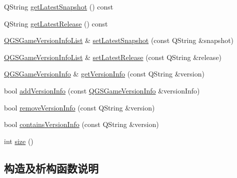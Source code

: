 \begin{DoxyCompactItemize}
\item 
Q\+String \mbox{\hyperlink{class_q_g_s_game_version_info_list_abc6e965492ca1e2851810ed19025bc1a}{get\+Latest\+Snapshot}} () const
\item 
Q\+String \mbox{\hyperlink{class_q_g_s_game_version_info_list_abef58dd9ea504eb695114ad4aa42890a}{get\+Latest\+Release}} () const
\item 
\mbox{\hyperlink{class_q_g_s_game_version_info_list}{Q\+G\+S\+Game\+Version\+Info\+List}} \& \mbox{\hyperlink{class_q_g_s_game_version_info_list_aaa46bcf75c76262047accb45a42dc930}{set\+Latest\+Snapshot}} (const Q\+String \&snapshot)
\item 
\mbox{\hyperlink{class_q_g_s_game_version_info_list}{Q\+G\+S\+Game\+Version\+Info\+List}} \& \mbox{\hyperlink{class_q_g_s_game_version_info_list_a11ed8706eb09bf808d7ac8d03db05ae7}{set\+Latest\+Release}} (const Q\+String \&release)
\item 
\mbox{\hyperlink{class_q_g_s_game_version_info}{Q\+G\+S\+Game\+Version\+Info}} \& \mbox{\hyperlink{class_q_g_s_game_version_info_list_a3ef43c376d76d6ff8ee921d7ced345bb}{get\+Version\+Info}} (const Q\+String \&version)
\item 
bool \mbox{\hyperlink{class_q_g_s_game_version_info_list_abb1e0ad8ff95a197d3cd8fbaf7e9393b}{add\+Version\+Info}} (const \mbox{\hyperlink{class_q_g_s_game_version_info}{Q\+G\+S\+Game\+Version\+Info}} \&version\+Info)
\item 
bool \mbox{\hyperlink{class_q_g_s_game_version_info_list_ae68ca4ebd43f20106a5e2ca7aad0ee66}{remove\+Version\+Info}} (const Q\+String \&version)
\item 
bool \mbox{\hyperlink{class_q_g_s_game_version_info_list_a75e4bc6d242ab83d11a4acb2686cf580}{contains\+Version\+Info}} (const Q\+String \&version)
\item 
int \mbox{\hyperlink{class_q_g_s_game_version_info_list_a330087d150f2bc0ee845a4d804fe1843}{size}} ()
\end{DoxyCompactItemize}


\subsection{构造及析构函数说明}
\mbox{\label{class_q_g_s_game_version_info_list_a725dd9a06d2220acce7d36f8aa2d6de2}} 
